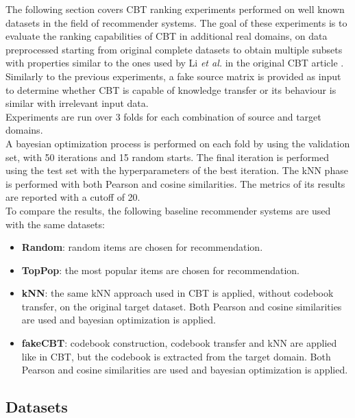 The following section covers CBT ranking experiments performed on well known datasets in the field of recommender systems. The goal of these experiments is to evaluate the ranking capabilities of CBT in additional real domains, on data preprocessed starting from original complete datasets to obtain multiple subsets with properties similar to the ones used by Li \textit{et al.} in the original CBT article \cite{10.5555/1661445.1661773}. Similarly to the previous experiments, a fake source matrix is provided as input to determine whether CBT is capable of knowledge transfer or its behaviour is similar with irrelevant input data.\\
Experiments are run over 3 folds for each combination of source and target domains.\\
A bayesian optimization process is performed on each fold by using the validation set, with 50 iterations and 15 random starts. The final iteration is performed using the test set with the hyperparameters of the best iteration. The kNN phase is performed with both Pearson and cosine similarities. The metrics of its results are reported with a cutoff of 20.\\
To compare the results, the following baseline recommender systems are used with the same datasets:
\begin{itemize}
\item \textbf{Random}: random items are chosen for recommendation.
\item \textbf{TopPop}: the most popular items are chosen for recommendation.
\item \textbf{kNN}: the same kNN approach used in CBT is applied, without codebook transfer, on the original target dataset. Both Pearson and cosine similarities are used and bayesian optimization is applied.
\item \textbf{fakeCBT}: codebook construction, codebook transfer and kNN are applied like in CBT, but the codebook is extracted from the target domain. Both Pearson and cosine similarities are used and bayesian optimization is applied.
\end{itemize}


\subsection{Datasets}

